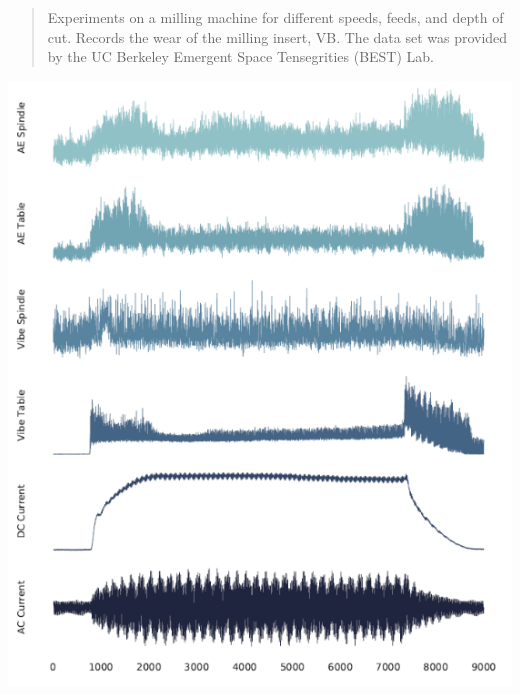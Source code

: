 \documentclass[
  letterpaper,
  DIV=11,
  numbers=noendperiod]{scrartcl}
\begin{document}
\begin{quote}
Experiments on a milling machine for different speeds, feeds, and depth
of cut. Records the wear of the milling insert, VB. The data set was
provided by the UC Berkeley Emergent Space Tensegrities (BEST) Lab.
\end{quote}

\includegraphics{img/2023-01-12-11-28-23.png}
\end{document}
